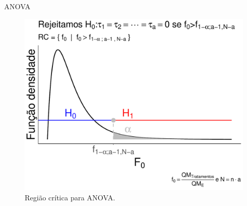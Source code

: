 \documentclass[8pt]{beamer}
\begin{document}
\begin{frame}{ANOVA}
\begin{figure}[htbp]
	\centering
	\includegraphics[width=0.70\linewidth]{figure/anova-test.pdf}
	\caption{Região crítica para ANOVA.}
\end{figure}
\end{frame}
\end{document}
